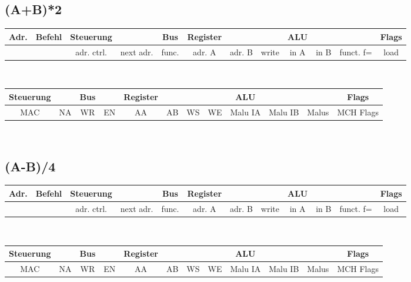 \documentclass[paper=a4, fontsize=11pt]{scrartcl}
\numberwithin{equation}{section}
\numberwithin{figure}{section}
\numberwithin{table}{section}
\begin{document}

\subsection{(A+B)*2}

\begin{tabular}{|c|c|cc|c|ccc|ccc|c|}
\hline
Adr. & Befehl &Steuerung & & Bus & Register & & & ALU & & & Flags \\
\hline
& & adr. ctrl. & next adr. & func. & adr. A & adr. B & write & in A & in B & funct. f= & load \\
\hline
\end{tabular} \\

\begin{tabular}{|cc|cc|cccc|ccc|c|}
\hline
Steuerung & & Bus & & Register & & & & ALU & & & Flags \\
\hline
MAC & NA & WR & EN & AA & AB & WS & WE & Malu IA & Malu IB & Malus & MCH Flags \\
\hline
\end{tabular} \\


\subsection{(A-B)/4}

\begin{tabular}{|c|c|cc|c|ccc|ccc|c|}
\hline
Adr. & Befehl &Steuerung & & Bus & Register & & & ALU & & & Flags \\
\hline
& & adr. ctrl. & next adr. & func. & adr. A & adr. B & write & in A & in B & funct. f= & load \\
\hline
\end{tabular} \\

\begin{tabular}{|cc|cc|cccc|ccc|c|}
\hline
Steuerung & & Bus & & Register & & & & ALU & & & Flags \\
\hline
MAC & NA & WR & EN & AA & AB & WS & WE & Malu IA & Malu IB & Malus & MCH Flags \\
\hline
\end{tabular} \\

\end{document}

